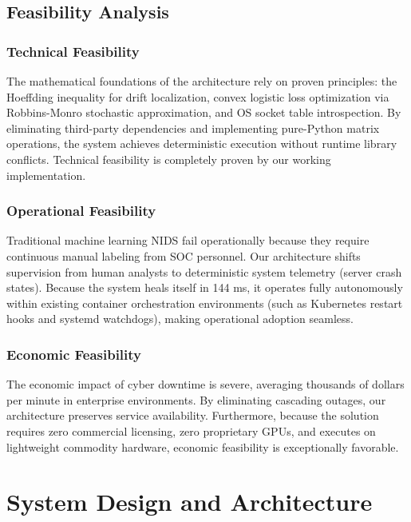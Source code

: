 \documentclass[12pt,a4paper,oneside]{report}
\begin{document}
\section{Feasibility Analysis}

\subsection{Technical Feasibility}
The mathematical foundations of the architecture rely on proven principles: the Hoeffding inequality for drift localization, convex logistic loss optimization via Robbins-Monro stochastic approximation, and OS socket table introspection. By eliminating third-party dependencies and implementing pure-Python matrix operations, the system achieves deterministic execution without runtime library conflicts. Technical feasibility is completely proven by our working implementation.

\subsection{Operational Feasibility}
Traditional machine learning NIDS fail operationally because they require continuous manual labeling from SOC personnel. Our architecture shifts supervision from human analysts to deterministic system telemetry (server crash states). Because the system heals itself in 144 ms, it operates fully autonomously within existing container orchestration environments (such as Kubernetes restart hooks and systemd watchdogs), making operational adoption seamless.

\subsection{Economic Feasibility}
The economic impact of cyber downtime is severe, averaging thousands of dollars per minute in enterprise environments. By eliminating cascading outages, our architecture preserves service availability. Furthermore, because the solution requires zero commercial licensing, zero proprietary GPUs, and executes on lightweight commodity hardware, economic feasibility is exceptionally favorable.


\chapter{System Design and Architecture}
\label{chap:design}
\end{document}
